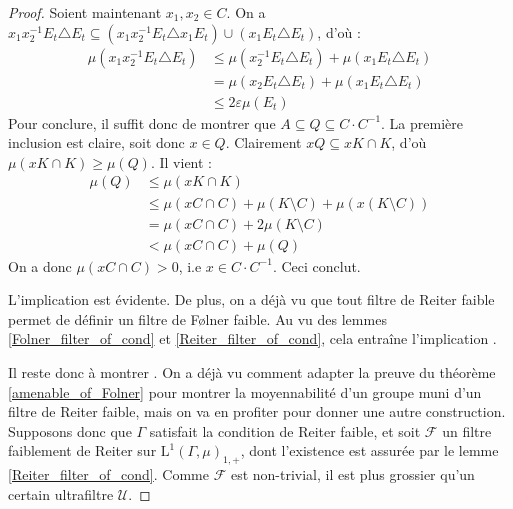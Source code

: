 \documentclass[a4paper,12pt]{article}
\newcommand{\inv}{^{-1}}
\renewcommand{\implies}{\Rightarrow}
\begin{document}
\begin{proof}
    Soient maintenant $x_1, x_2\in C$. On a $x_1x_2\inv E_t\triangle E_t\subseteq(x_1x_2\inv E_t\triangle x_1E_t)\cup(x_1 E_t\triangle E_t)$,
    d'où :
    \begin{align*}
        \mu(x_1x_2\inv E_t\triangle E_t) 
            &\leq \mu(x_2\inv E_t\triangle E_t) + \mu(x_1E_t\triangle E_t) \\
            &= \mu(x_2 E_t\triangle E_t) + \mu(x_1E_t\triangle E_t) \\
            &\leq 2\varepsilon\mu(E_t)
    \end{align*}
    Pour conclure, il suffit donc de montrer que $A\subseteq Q\subseteq C\cdot C\inv$. La première inclusion est claire, soit donc $x\in Q$.
    Clairement $xQ\subseteq xK\cap K$, d'où $\mu(xK\cap K)\geq\mu(Q)$. Il vient :
    \begin{align*}
        \mu(Q)  
            &\leq \mu(xK\cap K) \\
            &\leq \mu(xC\cap C) + \mu(K\setminus C) + \mu(x(K\setminus C)) \\
            &= \mu(xC\cap C) + 2\mu(K\setminus C) \\
            &< \mu(xC\cap C) + \mu(Q) 
    \end{align*}
    On a donc $\mu(xC\cap C)>0$, i.e $x\in C\cdot C\inv$. Ceci conclut.

    L'implication \framebox{$(\ref{amenable_TFAE/strong_Folner})\implies(\ref{amenable_TFAE/weak_Folner})$} est évidente.
    De plus, on a déjà vu que tout filtre de Reiter faible permet de définir un filtre de F\o{}lner faible. Au vu des lemmes 
    \ref{Folner_filter_of_cond} et \ref{Reiter_filter_of_cond}, cela entraîne l'implication 
    \framebox{$(\ref{amenable_TFAE/weak_Folner})\implies(\ref{amenable_TFAE/weak_Reiter})$}. 

    Il reste donc à montrer \framebox{$(\ref{amenable_TFAE/weak_Reiter})\implies(\ref{amenable_TFAE/amenable})$}. On a déjà vu comment 
    adapter la preuve du théorème \ref{amenable_of_Folner} pour montrer la moyennabilité d'un groupe muni d'un filtre de Reiter 
    faible, mais on va en profiter pour donner une autre construction. Supposons donc que $\Gamma$ satisfait la condition de Reiter faible,
    et soit $\mathscr{F}$ un filtre faiblement de Reiter sur $\mathrm{L}^1(\Gamma, \mu)_{1, +}$, dont l'existence est assurée par le lemme
    \ref{Reiter_filter_of_cond}. Comme $\mathscr{F}$ est non-trivial, il est plus grossier qu'un certain ultrafiltre $\mathscr{U}$. 


\end{proof}
\end{document}
